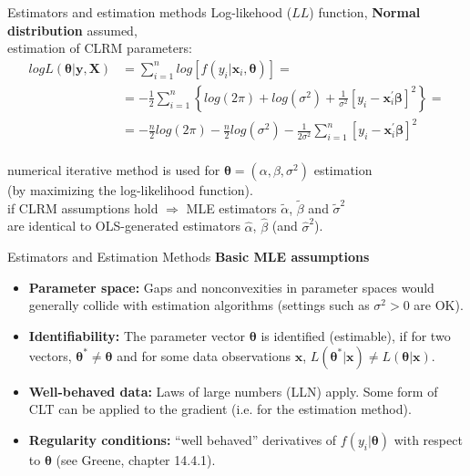 \documentclass{beamer}
\begin{document}
\begin{frame}{Estimators and estimation methods}
Log-likehood ($LL$) function, \textbf{Normal distribution} assumed,\\
estimation of CLRM parameters:\\
\begin{align*}
log L(\bm{\theta}|\bm{y}, \bm{X} ) & =\sum_{i=1}^n log[f(y_i|\bm{x}_i, \bm{\theta})] = \\
& = -\frac{1}{2} \sum_{i=1}^n \left\lbrace { log(2\pi) + log(\sigma^2)+\frac{1}{\sigma^2}[y_i-\bm{x}_i^{\prime}\bm{\beta}]^2} \right\rbrace = \\ 
& = -\frac{n}{2}log(2\pi)-\frac{n}{2}log(\sigma^2)-\frac{1}{2\sigma^2} \sum_{i=1}^n [y_i-\bm{x}_i^{\prime}\bm{\beta}]^2
\end{align*}
\\ \bigskip
numerical iterative method is used for $\bm{\theta}=(\alpha, \beta, \sigma^2)$ estimation\\
(by maximizing the log-likelihood function).\\
if CLRM assumptions hold $\Rightarrow$ MLE estimators $\tilde{\alpha}$, $\tilde{\beta}$ and $\tilde{\sigma}^2$\\ are identical to OLS-generated estimators $\hat{\alpha}$, $\hat{\beta}$ (and $\hat{\sigma}^2$).
\end{frame}
\begin{frame}{Estimators and Estimation Methods}
\textbf{Basic MLE assumptions}\\
\begin{itemize}
    \item \textbf{Parameter space:} Gaps and nonconvexities in parameter spaces would generally collide with estimation algorithms (settings such as $\sigma^2 > 0$ are OK).
    \item \textbf{Identifiability:} The parameter vector $\bm{\theta}$ is identified (estimable), if for two vectors, $\bm{\theta}^{*} \neq \bm{\theta}$ and for some data observations $\bm{x}$, $L(\bm{\theta}^{*}|\bm{x}) \neq L(\bm{\theta}|\bm{x})$.
    \item \textbf{Well-behaved data:} Laws of large numbers (LLN) apply. Some form of CLT can be applied to the gradient (i.e. for the estimation method).
    \item \textbf{Regularity conditions:} ``well behaved'' derivatives of $f(y_i|\bm{\theta})$ with respect to $\bm{\theta}$ (see Greene, chapter 14.4.1).
\end{itemize}
\end{frame}
\end{document}
